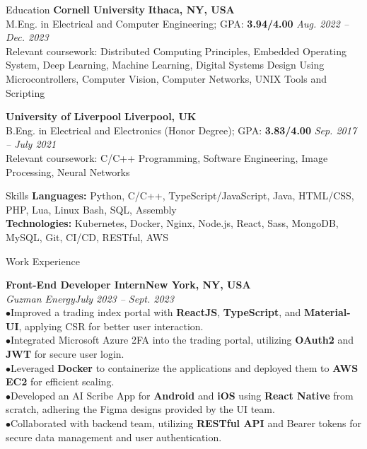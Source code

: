 \documentclass{resume} %
\begin{document}
\begin{rSection}{Education}
{\textbf{Cornell University}} \hfill{\textbf{Ithaca, NY, USA}}
\\ M.Eng. in Electrical and Computer Engineering; GPA: \textbf{3.94/4.00} \hfill{\em Aug. 2022 -- Dec. 2023}
\\ Relevant coursework: Distributed Computing Principles, Embedded Operating System, Deep Learning, Machine Learning, Digital Systems Design Using Microcontrollers, Computer Vision, Computer Networks, UNIX Tools and Scripting

{\textbf{University of Liverpool}} \hfill{\textbf{Liverpool, UK}}
\\ B.Eng. in Electrical and Electronics (Honor Degree); GPA: \textbf{3.83/4.00} \hfill{\em Sep. 2017 -- July 2021}
\\ Relevant coursework: C/C++ Programming, Software Engineering, Image Processing, Neural Networks
\end{rSection}

\begin{rSection}{Skills}
{\textbf{Languages:}} Python, C/C++, TypeScript/JavaScript, Java, HTML/CSS, PHP, Lua, Linux Bash, SQL, Assembly
\\{\textbf{Technologies:}} Kubernetes, Docker, Nginx, Node.js, React, Sass, MongoDB, MySQL, Git, CI/CD, RESTful, AWS


\end{rSection}

\begin{rSection}{Work Experience}

{\bf Front-End Developer Intern}\hfill{\textbf{New York, NY, USA}}
\\{\em Guzman Energy}\hfill {\em July 2023 -- Sept. 2023}
\\ $ \bullet $Improved a trading index portal with \textbf{ReactJS}, \textbf{TypeScript}, and \textbf{Material-UI}, applying CSR for better user interaction.
\\ $ \bullet $Integrated Microsoft Azure 2FA into the trading portal, utilizing \textbf{OAuth2} and \textbf{JWT} for secure user login.
\\ $ \bullet $Leveraged \textbf{Docker} to containerize the applications and deployed them to \textbf{AWS EC2} for efficient scaling.
\\ $ \bullet $Developed an AI Scribe App for \textbf{Android} and \textbf{iOS} using \textbf{React Native} from scratch, adhering the Figma designs provided by the UI team.
\\ $ \bullet $Collaborated with backend team, utilizing \textbf{RESTful API} and Bearer tokens for secure data management and user authentication.


\end{rSection}
\end{document}
